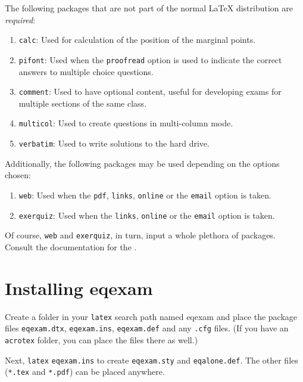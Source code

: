\documentclass{article}
\begin{document}
The following packages that are not part of the normal {\LaTeX}
distribution are \emph{required}:
\begin{enumerate}
\item \texttt{calc}: Used for calculation of the position of the
    marginal points.

\item \texttt{pifont}: Used when the \texttt{proofread} option is
    used to indicate the correct answers to multiple choice questions.

\item \texttt{comment}: Used to have optional content, useful for
    developing exams for multiple sections of the same class.

\item \texttt{multicol}: Used to create questions in multi-column mode.

\item \texttt{verbatim}: Used to write solutions to the hard drive.
\end{enumerate}

\noindent Additionally, the following packages may be used
depending on the options chosen:
\begin{enumerate}
\item \texttt{web}: Used when the \texttt{pdf}, \texttt{links},
    \texttt{online} or the \texttt{email} option is taken.

\item \texttt{exerquiz}: Used when the
    \texttt{links}, \texttt{online} or the \texttt{email} option is
    taken.
\end{enumerate}
Of course, \texttt{web} and \texttt{exerquiz}, in turn, input a
whole plethora of packages. Consult the documentation for the
\cAcroEB.

\section{Installing \textsf{eqexam}}

Create a folder in your \texttt{latex} search path named
\textsf{eqexam} and place the package files \texttt{eqexam.dtx},
\texttt{eqexam.ins}, \texttt{eqexam.def} and any \texttt{.cfg}
files. (If you have an \texttt{acrotex} folder, you can place the
files there as well.)

Next, \texttt{latex} \texttt{eqexam.ins} to create
\texttt{eqexam.sty} and \texttt{eqalone.def}. The other files
(\texttt{*.tex} and \texttt{*.pdf}) can be placed anywhere.
\end{document}
